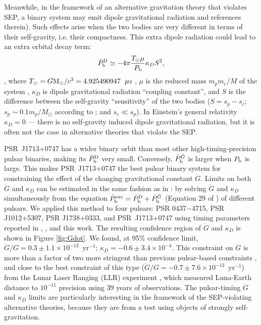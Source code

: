 Meanwhile, in the framework of an alternative gravitation theory that violates
SEP, a binary system may emit dipole gravitational radiation \citealt{Will93, Will01, lwj+09, fwe+12} and references
therein). Such effects arise when the two bodies are very different in terms
of their self-gravity, i.e.  their compactness.
This extra dipole radiation could lead to an extra orbital decay term:
\begin{equation}
\dot{P}_{\rm b}^{\rm D} \simeq -4\pi\frac{T_{\odot}\mu}{P_{\rm b}}\kappa_D S^2,
\end{equation}
\citep{lwj+09}, where $T_{\odot}=G{\rm M_{\odot}}/c^3=4.925490947$~${\rm
\mu}$s \citep{lk05}, $\mu$ is the reduced mass $m_pm_c/M$ of the system , $\kappa_D $ is dipole
gravitational radiation ``coupling constant'', and $S$ is the difference
between the self-gravity ``sensitivity'' of the two bodies ($S = s_p - s_c$;
$s_p\sim0.1m_p/M_{\odot}$ according to \citealt{de92} ; and $s_c\ll s_p$).
In Einstein's general relativity $\kappa_D=0$ --- there is no self-gravity induced
dipole gravitational radiation, but it is often not the case in alternative
theories that violate the SEP.

PSR~J1713+0747 has a wider binary orbit than most other
high-timing-precision pulsar binaries, making its $\dot{P}_{\rm b}^{\rm D}$
very small. Conversely, $\dot{P}_{\rm b}^{\dot{G}}$ is larger when $P_{\rm b}$
is large. This makes PSR~J1713+0747 the best pulsar binary system for constraining
the effect of the changing gravitational constant $\dot{G}$. Limits 
on both $\dot{G}$ and $\kappa_D$ can be estimated in the same fashion as in
\citet{lwj+09}: by solving $\dot{G}$ and $\kappa_D$ simultaneously 
from the equation $\dot{P}_{\rm b}^{\rm exc} = \dot{P}_{\rm b}^{\rm D} +
\dot{P}_{\rm b}^{\dot{G}}$ (Equation 29 of \citealt{lwj+09}) of different
pulsars. We applied this method to four pulsars: PSR 0437$-$4715, PSR J1012+5307, PSR
J1738+0333, and PSR~J1713+0747 using timing parameters reported in
\citet{lwj+09}, \citet{fwe+12}, and this work.
The resulting confidence region of $\dot{G}$ and $\kappa_D$ is shown in Figure
\ref{fig:Gdot}.
We found, at 95\% confidence limit, $\dot{G}/G =
0.3\pm1.1\times10^{-12}$~yr$^{-1}$; $\kappa_D=-0.6\pm3.4\times10^{-4}$. 
This constraint on $\dot{G}$ is more than a factor of two more stringent than
previous pulsar-based constraints \citep{fwe+12}, and close to 
the best constraint of this type
($\dot{G}/G=-0.7\pm7.6\times10^{-13}$~yr$^{-1}$) from the Lunar Laser Ranging
(LLR)
experiment \citep{hmb10}, which measured Luna-Earth distance to $10^{-11}$
precision using 39 years of observations.
The pulsar-timing $\dot{G}$ and $\kappa_D$ limits are particularly interesting 
in the framework of the SEP-violating alternative theories, because they are from 
a test using objects of strongly self-gravitation.

